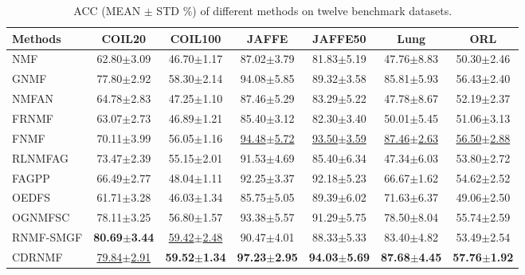 \documentclass[a4paper,fleqn]{cas-sc}
\begin{document}
\begin{table}[htbp]
	\centering
	\caption{ACC (MEAN $\pm$ STD $\%$) of different methods on twelve benchmark datasets.}
	{\footnotesize
	\begin{tabular}{lcccccc}
		\hline
		\textbf{Methods} & \textbf{COIL20} & \textbf{COIL100} & \textbf{JAFFE} & \textbf{JAFFE50} & \textbf{Lung} & \textbf{ORL} \\
		\hline
		NMF & 62.80$\pm$3.09 & 46.70$\pm$1.17 & 87.02$\pm$3.79 & 81.83$\pm$5.19 & 47.76$\pm$8.83 & 50.30$\pm$2.46 \\
		GNMF & 77.80$\pm$2.92 & 58.30$\pm$2.14 & 94.08$\pm$5.85 & 89.32$\pm$3.58 & 85.81$\pm$5.93 & 56.43$\pm$2.40 \\
		NMFAN & 64.78$\pm$2.83 & 47.25$\pm$1.10 & 87.46$\pm$5.29 & 83.29$\pm$5.22 & 47.78$\pm$8.67 & 52.19$\pm$2.37 \\
		FRNMF & 63.07$\pm$2.73 & 46.89$\pm$1.21 & 85.40$\pm$3.12 & 82.30$\pm$3.40 & 50.01$\pm$5.45 & 51.06$\pm$3.13 \\
		FNMF & 70.11$\pm$3.99 & 56.05$\pm$1.16 & \underline{94.48$\pm$5.72} & \underline{93.50$\pm$3.59} & \underline{87.46$\pm$2.63} & \underline{56.50$\pm$2.88} \\
		RLNMFAG & 73.47$\pm$2.39 & 55.15$\pm$2.01 & 91.53$\pm$4.69 & 85.40$\pm$6.34 & 47.34$\pm$6.03 & 53.80$\pm$2.72 \\
		FAGPP & 66.49$\pm$2.77 & 48.04$\pm$1.11 & 92.25$\pm$3.37 & 92.18$\pm$5.23 & 66.67$\pm$1.62 & 54.62$\pm$2.52 \\
		OEDFS & 61.71$\pm$3.28 & 46.03$\pm$1.34 & 85.75$\pm$5.05 & 89.39$\pm$6.02 & 71.63$\pm$6.37 & 49.06$\pm$2.50 \\
		OGNMFSC & 78.11$\pm$3.25 & 56.80$\pm$1.57 & 93.38$\pm$5.57 & 91.29$\pm$5.75 & 78.50$\pm$8.04 & 55.74$\pm$2.59 \\
		RNMF-SMGF & \textbf{80.69$\pm$3.44} & \underline{59.42$\pm$2.48} & 90.47$\pm$4.01 & 88.33$\pm$5.33 & 83.40$\pm$4.82 & 53.49$\pm$2.54 \\
		CDRNMF & \underline{79.84$\pm$2.91} & \textbf{59.52$\pm$1.34} & \textbf{97.23$\pm$2.95} & \textbf{94.03$\pm$5.69} & \textbf{87.68$\pm$4.45} & \textbf{57.76$\pm$1.92} \\
		\hline
	

\end{tabular}}
\end{table}
\end{document}
